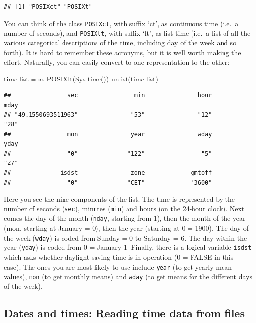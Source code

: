 \documentclass[
]{book}
\newenvironment{Shaded}{\begin{snugshade}}{\end{snugshade}}
\newcommand{\FunctionTok}[1]{\textcolor[rgb]{0.00,0.00,0.00}{#1}}
\newcommand{\NormalTok}[1]{#1}
\newcommand{\OtherTok}[1]{\textcolor[rgb]{0.56,0.35,0.01}{#1}}
\theoremstyle{definition}
\theoremstyle{definition}
\theoremstyle{definition}
\theoremstyle{definition}
\theoremstyle{remark}
\begin{document}
\begin{verbatim}
## [1] "POSIXct" "POSIXt"
\end{verbatim}

You can think of the class \texttt{POSIXct}, with suffix `ct', as continuous time (i.e.~a number of seconds), and
\texttt{POSIXlt}, with suffix `lt', as list time (i.e.~a list of all the various categorical descriptions of the time,
including day of the week and so forth). It is hard to remember these acronyms, but it is well worth making
the effort. Naturally, you can easily convert to one representation to the other:

\begin{Shaded}
\begin{Highlighting}[]
\NormalTok{time.list }\OtherTok{=} \FunctionTok{as.POSIXlt}\NormalTok{(}\FunctionTok{Sys.time}\NormalTok{())}
\FunctionTok{unlist}\NormalTok{(time.list)}
\end{Highlighting}
\end{Shaded}

\begin{verbatim}
##                sec                min               hour               mday 
## "49.1550693511963"               "53"               "12"               "28" 
##                mon               year               wday               yday 
##                "0"              "122"                "5"               "27" 
##              isdst               zone             gmtoff 
##                "0"              "CET"             "3600"
\end{verbatim}

Here you see the nine components of the list. The time is represented by the number of seconds (\texttt{sec}), minutes (\texttt{min}) and hours (on the 24-hour clock). Next comes the day of the month (\texttt{mday}, starting from 1), then the month of the year (mon, starting at January = 0), then the year (starting at 0 = 1900). The day of the week (\texttt{wday}) is coded from Sunday = 0 to Saturday = 6. The day within the year (\texttt{yday}) is coded from 0 = January 1. Finally, there is a logical variable \texttt{isdst} which asks whether daylight saving time is in operation (0 = FALSE in this case). The ones you are most likely to use include \texttt{year} (to get yearly mean values), \texttt{mon} (to get monthly means) and \texttt{wday} (to get means for the different days of the week).

\hypertarget{dates-and-times-reading-time-data-from-files}{%
\subsection{Dates and times: Reading time data from files}\label{dates-and-times-reading-time-data-from-files}}
\end{document}
